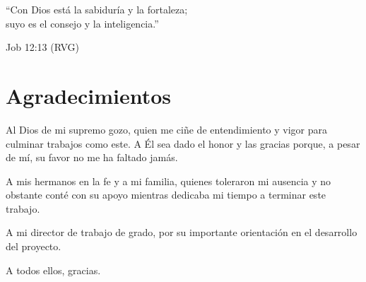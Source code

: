 \newpage{\pagestyle{empty}\cleardoublepage}

\newpage
\thispagestyle{empty}\normalsize \vspace*{3cm}

\begin{flushright}
    \begin{minipage}{8cm}
        \setlength{\parskip}{2em}  %
        \noindent
        \small
        \begin{center}
            ``Con Dios está la sabiduría y la fortaleza;\\suyo es el consejo y la inteligencia.''
        \end{center}
        \begin{flushright}
            Job 12:13 (RVG)
        \end{flushright}
    \end{minipage}
\end{flushright}

\newpage{\pagestyle{empty}\cleardoublepage}

\newpage
\thispagestyle{empty}\normalsize \vspace*{3cm}

\chapter*{Agradecimientos}
Al Dios de mi supremo gozo, quien me ciñe de entendimiento y vigor para culminar trabajos como este.
A Él sea dado el honor y las gracias porque, a pesar de mí, su favor no me ha faltado jamás.

A mis hermanos en la fe y a mi familia, quienes toleraron mi ausencia y no obstante conté con su apoyo mientras
dedicaba mi tiempo a terminar este trabajo.

A mi director de trabajo de grado, por su importante orientación en el desarrollo del proyecto.

A todos ellos, gracias.

\newpage{\pagestyle{empty}\cleardoublepage}

\newpage
